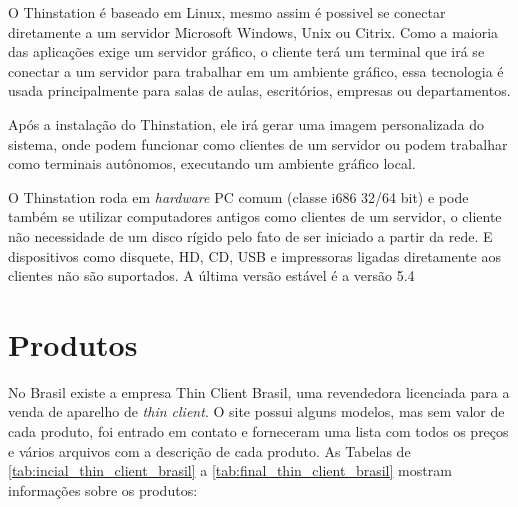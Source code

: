 \documentclass[
	12pt,				%
	openright,			%
	twoside,			%
	a4paper,			%
	chapter=TITLE,		%
	english,			%
	brazil				%
	]{abntex2}
\begin{document}
O Thinstation é baseado em Linux, mesmo assim é possivel se conectar diretamente a um servidor Microsoft Windows, Unix ou Citrix. Como a maioria das aplicações exige um servidor gráfico, o cliente terá um terminal que irá se conectar a um servidor para trabalhar em um ambiente gráfico, essa tecnologia é usada principalmente para salas de aulas, escritórios, empresas ou departamentos.\cite{Thinstationl}

Após a instalação do Thinstation, ele irá gerar uma imagem personalizada do sistema, onde podem funcionar como clientes de um servidor ou podem trabalhar como terminais autônomos, executando um ambiente gráfico local.\cite{Thinstationl}

O Thinstation roda em \textit{hardware} PC comum (classe i686 32/64 bit) e pode também se utilizar computadores antigos como clientes de um servidor, o cliente não necessidade de um disco rígido pelo fato de ser iniciado a partir da rede. E dispositivos como disquete, HD, CD, USB e impressoras ligadas diretamente aos clientes não são suportados. A última versão estável é a versão 5.4\cite{Thinstationl,piaui}


\section{Produtos}

No Brasil existe a empresa Thin Client Brasil, uma revendedora licenciada para a venda de aparelho de \textit{thin client}. O site possui alguns modelos, mas sem valor de cada produto, foi entrado em contato e forneceram uma lista com todos os preços e vários arquivos com a descrição de cada produto.  As Tabelas de  \ref{tab:incial_thin_client_brasil} a \ref{tab:final_thin_client_brasil} mostram informações sobre os produtos:

 
\newpage

 \begin{table}[h!]
\end{table}
 
\end{document}
